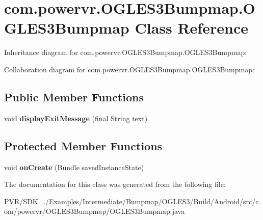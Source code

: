 \hypertarget{classcom_1_1powervr_1_1_o_g_l_e_s3_bumpmap_1_1_o_g_l_e_s3_bumpmap}{\section{com.\+powervr.\+O\+G\+L\+E\+S3\+Bumpmap.\+O\+G\+L\+E\+S3\+Bumpmap Class Reference}
\label{classcom_1_1powervr_1_1_o_g_l_e_s3_bumpmap_1_1_o_g_l_e_s3_bumpmap}
}


Inheritance diagram for com.\+powervr.\+O\+G\+L\+E\+S3\+Bumpmap.\+O\+G\+L\+E\+S3\+Bumpmap\+:


Collaboration diagram for com.\+powervr.\+O\+G\+L\+E\+S3\+Bumpmap.\+O\+G\+L\+E\+S3\+Bumpmap\+:
\subsection*{Public Member Functions}
\begin{DoxyCompactItemize}
\item 
\hypertarget{classcom_1_1powervr_1_1_o_g_l_e_s3_bumpmap_1_1_o_g_l_e_s3_bumpmap_ae16918996a0e3bc98062159cdabae47c}{void {\bfseries display\+Exit\+Message} (final String text)}\label{classcom_1_1powervr_1_1_o_g_l_e_s3_bumpmap_1_1_o_g_l_e_s3_bumpmap_ae16918996a0e3bc98062159cdabae47c}

\end{DoxyCompactItemize}
\subsection*{Protected Member Functions}
\begin{DoxyCompactItemize}
\item 
\hypertarget{classcom_1_1powervr_1_1_o_g_l_e_s3_bumpmap_1_1_o_g_l_e_s3_bumpmap_ae2b01f6599d76a6595a810e4270da54a}{void {\bfseries on\+Create} (Bundle saved\+Instance\+State)}\label{classcom_1_1powervr_1_1_o_g_l_e_s3_bumpmap_1_1_o_g_l_e_s3_bumpmap_ae2b01f6599d76a6595a810e4270da54a}

\end{DoxyCompactItemize}


The documentation for this class was generated from the following file\+:\begin{DoxyCompactItemize}
\item 
P\+V\+R/\+S\+D\+K\+\_./\+Examples/\+Intermediate/\+Bumpmap/\+O\+G\+L\+E\+S3/\+Build/\+Android/src/com/powervr/\+O\+G\+L\+E\+S3\+Bumpmap/O\+G\+L\+E\+S3\+Bumpmap.\+java\end{DoxyCompactItemize}
